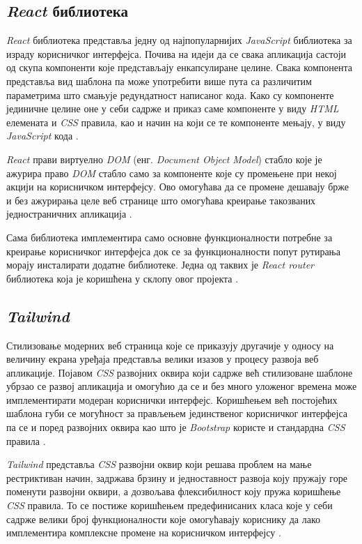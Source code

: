 \documentclass[12pt,oneside]{memoir}
\begin{document}
\subsection{\textit{React} библиотека}
\label{section:react}
\textit{React} библиотека представља једну од најпопуларнијих \textit{JavaScript} библиотека за израду корисничког интерфејса.  Почива на идеји да се свака апликација састоји од скупа компоненти које представљају енкапсулиране целине. Свака компонента представља вид шаблона па може употребити више пута са различитим параметрима што смањује редундатност написаног кода. Како су компоненте јединичне целине оне у себи садрже и приказ саме компоненте у виду \textit{HTML} елемената и \textit{CSS} правила, као и начин на који се те компоненте мењају, у виду \textit{JavaScript} кода \cite{react}.

\textit{React} прави виртуелно \textit{DOM} (енг. \textit{Document Object Model}) стабло које је ажурира право \textit{DOM} стабло само за компоненте које су промењене при некој акцији на корисничком интерфејсу. Ово омогућава да се промене дешавају брже и без ажурирања целе веб странице што омогућава креирање такозваних једностраничних апликација \cite{react}. 

Сама библиотека имплементира само основне функционалности потребне за креирање корисничког интерфејса док се за функционалности попут рутирања морају инсталирати додатне библиотеке. Једна од таквих је \textit{React router} библиотека која је коришћена у склопу овог пројекта \cite{reactRouter}.

\subsection{\textit{Tailwind} }

Стилизовање модерних веб страница које се приказују другачије у односу на величину екрана уређаја представља велики изазов у процесу развоја веб апликације. Појавом \textit{CSS} развојних оквира који садрже већ стилизоване шаблоне убрзао се развој апликација и омогућио да се и без много уложеног времена може имплементирати модеран кориснички интерфејс. Коришћењем већ постојећих шаблона губи се могућност за прављењем јединственог корисничког интерфејса па се и поред развојних оквира као што је \textit{Bootstrap} користе и стандардна \textit{CSS} правила \cite{bootstrap}.

\textit{Tailwind} представља \textit{CSS} развојни оквир који решава проблем на мање рестриктиван начин, задржава брзину и једноставност развоја коју пружају горе поменути развојни оквири, а дозвољава флексибилност коју пружа коришћење \textit{CSS} правила. То се постиже коришћењем предефинисаних класа које у себи садрже велики број функционалности које омогућавају кориснику да лако имплементира комплексне промене на корисничком интерфејсу \cite{tailwind}.
\end{document}
